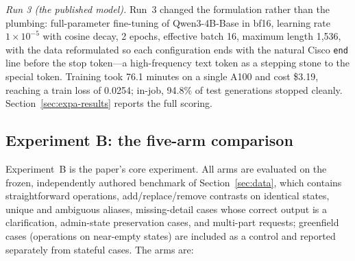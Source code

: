 \documentclass[conference]{IEEEtran}
\begin{document}
\emph{Run 3 (the published model).} Run~3 changed the formulation rather than the plumbing: full-parameter fine-tuning of Qwen3-4B-Base in bf16, learning rate $1\times10^{-5}$ with cosine decay, 2 epochs, effective batch 16, maximum length 1,536, with the data reformulated so each configuration ends with the natural Cisco \texttt{end} line before the stop token---a high-frequency text token as a stepping stone to the special token. Training took 76.1 minutes on a single A100 and cost \$3.19, reaching a train loss of 0.0254; in-job, 94.8\% of test generations stopped cleanly. Section~\ref{sec:expa-results} reports the full scoring.

\subsection{Experiment B: the five-arm comparison}
\label{sec:expb}

Experiment~B is the paper's core experiment. All arms are evaluated on the frozen, independently authored benchmark of Section~\ref{sec:data}, which contains straightforward operations, add/replace/remove contrasts on identical states, unique and ambiguous aliases, missing-detail cases whose correct output is a clarification, admin-state preservation cases, and multi-part requests; greenfield cases (operations on near-empty states) are included as a control and reported separately from stateful cases. The arms are:
\end{document}
